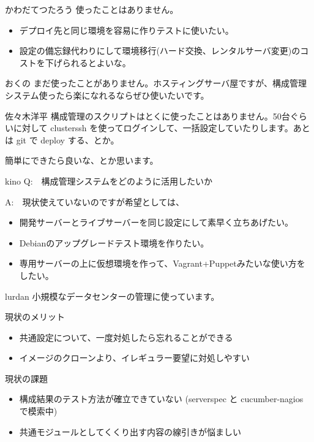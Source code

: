 \documentclass[mingoth,a4paper]{jsarticle}
\begin{document}
\begin{prework}{ かわだてつたろう }
  使ったことはありません。

  \begin{itemize}
  \item デプロイ先と同じ環境を容易に作りテストに使いたい。
  \item 設定の備忘録代わりにして環境移行(ハード交換、レンタルサーバ変更)のコストを下げられるとよいな。
  \end{itemize}
\end{prework}

\begin{prework}{ おくの }
  まだ使ったことがありません。ホスティングサーバ屋ですが、構成管理システム使ったら楽になれるならぜひ使いたいです。
\end{prework}

\begin{prework}{ 佐々木洋平 }
  構成管理のスクリプトはとくに使ったことはありません。50台ぐらいに対して clusterssh を使ってログインして、一括設定していたりします。あとは git で deploy する、とか。

  簡単にできたら良いな、とか思います。
\end{prework}

\begin{prework}{ kino }
  Q:　構成管理システムをどのように活用したいか

  A:　現状使えていないのですが希望としては、
  \begin{itemize}
  \item 開発サーバーとライブサーバーを同じ設定にして素早く立ちあげたい。
  \item Debianのアップグレードテスト環境を作りたい。
  \item 専用サーバーの上に仮想環境を作って、Vagrant+Puppetみたいな使い方をしたい。
  \end{itemize}
\end{prework}

\begin{prework}{ lurdan }
  小規模なデータセンターの管理に使っています。

  現状のメリット
  \begin{itemize}
  \item 共通設定について、一度対処したら忘れることができる
  \item イメージのクローンより、イレギュラー要望に対処しやすい
  \end{itemize}

  現状の課題
  \begin{itemize}
  \item 構成結果のテスト方法が確立できていない (serverspec と cucumber-nagios で模索中)
  \item 共通モジュールとしてくくり出す内容の線引きが悩ましい
  \end{itemize}
\end{prework}
\end{document}
